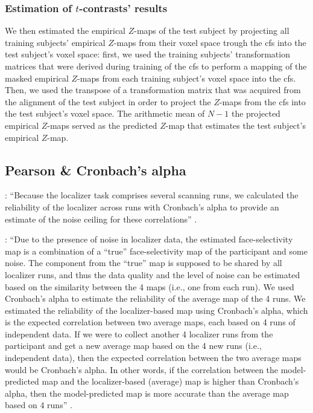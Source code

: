 \subsubsection{Estimation of $t$-contrasts' results}

We then estimated the empirical $Z$-maps of the test subject by projecting all
training subjects' empirical $Z$-maps from their voxel space trough the \ac{cfs}
into the test subject's voxel space:
first, we used the training subjects' transformation matrices that were derived
during training of the \ac{cfs} to perform a mapping of the masked empirical
$Z$-maps from each training subject's voxel space into the \ac{cfs}.
Then, we used the transpose of a transformation matrix that was acquired from
the alignment of the test subject in order to project the $Z$-maps from the
\ac{cfs} into the test subject's voxel space.
The arithmetic mean of $N-1$ the projected empirical $Z$-maps served as the
predicted $Z$-map that estimates the test subject's empirical $Z$-map.



\subsection{Pearson \& Cronbach's alpha}


\citet{jiahui2022cross}: ``Because the localizer task comprises several scanning
runs, we calculated the reliability of the localizer across runs with Cronbach's
alpha to provide an estimate of the noise ceiling for these correlations''
\citep{jiahui2022cross}.

%
\citep{feilong2022individualized}: ``Due to the presence of noise in localizer
data, the estimated face-selectivity map is a combination of a “true”
face-selectivity map of the participant and some noise.
%
The component from the “true” map is supposed to be shared by all localizer
runs, and thus the data quality and the level of noise can be estimated based on
the similarity between the 4 maps (i.e., one from each run).
%
We used Cronbach's alpha to estimate the reliability  of the average map of the
4 runs.
%
We estimated the reliability of the localizer-based map using Cronbach's alpha,
which is the expected correlation between two average maps, each based on 4 runs
of independent data.
%
If we were to collect another 4 localizer runs from the participant and get a
new average map based on the 4 new runs (i.e., independent data), then the
expected correlation between the two average maps would be Cronbach's alpha.
%
In other words, if the correlation between the model-predicted map and the
localizer-based (average) map is higher than Cronbach's alpha, then the
model-predicted map is more accurate than the average map based on 4 runs''
\citep{feilong2022individualized}.

